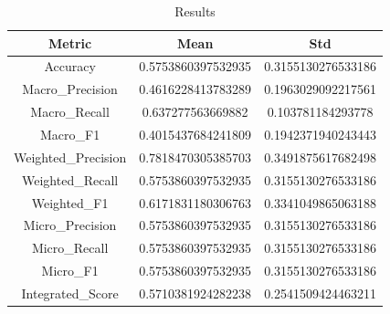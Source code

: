 \begin{table}[htbp]
\centering
\caption{Results}
\label{tab:csv}
\small
\setlength{\tabcolsep}{4pt}
\begin{tabular}{|c|c|c|}
\hline
Metric & Mean & Std \\
\hline
Accuracy & 0.5753860397532935 & 0.3155130276533186 \\
Macro_Precision & 0.4616228413783289 & 0.1963029092217561 \\
Macro_Recall & 0.637277563669882 & 0.103781184293778 \\
Macro_F1 & 0.4015437684241809 & 0.1942371940243443 \\
Weighted_Precision & 0.7818470305385703 & 0.3491875617682498 \\
Weighted_Recall & 0.5753860397532935 & 0.3155130276533186 \\
Weighted_F1 & 0.6171831180306763 & 0.3341049865063188 \\
Micro_Precision & 0.5753860397532935 & 0.3155130276533186 \\
Micro_Recall & 0.5753860397532935 & 0.3155130276533186 \\
Micro_F1 & 0.5753860397532935 & 0.3155130276533186 \\
Integrated_Score & 0.5710381924282238 & 0.2541509424463211 \\
\hline
\end{tabular}
\end{table}